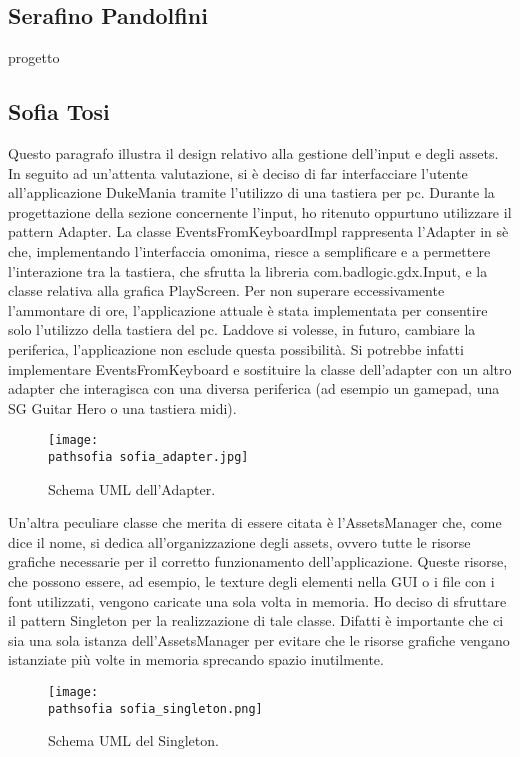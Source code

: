 \documentclass[a4paper,12pt]{report}
\newcommand\pathsofia{img/sofia/}
\begin{document}
\subsection{Serafino Pandolfini}
progetto 
\newpage
\subsection{Sofia Tosi}
Questo paragrafo illustra il design relativo alla gestione dell'input e degli assets.
In seguito ad un'attenta valutazione, si è deciso di far interfacciare l'utente all'applicazione DukeMania tramite l'utilizzo di
una tastiera per pc. 
Durante la progettazione della sezione concernente l'input, ho ritenuto oppurtuno utilizzare il pattern Adapter.
La classe EventsFromKeyboardImpl rappresenta l'Adapter in sè che, implementando l'interfaccia omonima, riesce a semplificare e a permettere l'interazione
tra la tastiera, che sfrutta la libreria com.badlogic.gdx.Input, e la classe relativa alla grafica PlayScreen.
Per non superare eccessivamente l'ammontare di ore, l'applicazione attuale è stata implementata per consentire solo l'utilizzo della tastiera del pc. 
Laddove si volesse, in futuro, cambiare la periferica, l'applicazione non esclude questa possibilità. Si potrebbe infatti implementare EventsFromKeyboard 
e sostituire la classe dell'adapter con un altro adapter che interagisca con una diversa periferica (ad esempio un gamepad, una SG Guitar Hero o una tastiera midi).
\newline
\begin{figure}[!htb]
	\centerline{\texttt{[image: \\pathsofia sofia\_adapter.jpg]}}
	\caption{Schema UML dell'Adapter.}
	\label{img:adapter}
\end{figure}
\clearpage \hfill\break
Un'altra peculiare classe che merita di essere citata è l'AssetsManager che, come dice il nome, si dedica all'organizzazione degli assets, ovvero tutte le risorse grafiche
necessarie per il corretto funzionamento dell'applicazione. Queste risorse, che possono essere, ad esempio, le texture degli elementi nella GUI o i file con i font utilizzati,
vengono caricate una sola volta in memoria.
Ho deciso di sfruttare il pattern Singleton per la realizzazione di tale classe. Difatti è importante che ci sia una sola istanza dell'AssetsManager per evitare che le risorse 
grafiche vengano istanziate più volte in memoria sprecando spazio inutilmente. 
\newline
\begin{figure}[!htb]
	\centerline{\texttt{[image: \\pathsofia sofia\_singleton.png]}}
	\caption{Schema UML del Singleton.}
	\label{img:singleton}
\end{figure}
\clearpage \hfill\break
\end{document}
